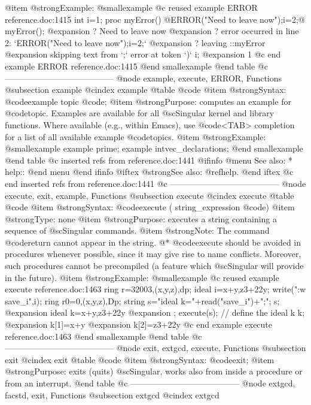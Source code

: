 @item @strong{Example:}
@smallexample
@c reused example ERROR reference.doc:1415 
int i=1;
proc myError() @{ERROR("Need to leave now");i=2;@}
myError();
@expansion{}    ? Need to leave now
@expansion{}    ? error occurred in line 2: `ERROR("Need to leave now");i=2;`
@expansion{}    ? leaving ::myError
@expansion{}    skipping text from `;` error at token `)`
i;
@expansion{} 1
@c end example ERROR reference.doc:1415
@end smallexample
@end table
@c ---------------------------------------
@node example, execute, ERROR, Functions
@subsection example
@cindex example
@table @code
@item @strong{Syntax:}
@code{example} topic @code{;}
@item @strong{Purpose:}
computes an example for @code{topic}. Examples are available for all
@sc{Singular} kernel and library functions. Where available (e.g.,
within Emacs), use @code{<TAB>} completion for a list of all available
example @code{topic}s.
@item @strong{Example:}
@smallexample
example prime;
example intvec_declarations;
@end smallexample
@end table
@c inserted refs from reference.doc:1441
@ifinfo
@menu
See also:
* help::
@end menu
@end ifinfo
@iftex
@strong{See also:}
@ref{help}.
@end iftex
@c end inserted refs from reference.doc:1441
@c ---------------------------------------
@node execute, exit, example, Functions
@subsection execute
@cindex execute
@table @code
@item @strong{Syntax:}
@code{execute (} string_expression @code{)}
@item @strong{Type:}
none
@item @strong{Purpose:}
executes a string containing a sequence of @sc{Singular} commands.
@item @strong{Note:}
The command @code{return} cannot appear in the string.
@* @code{execute} should be avoided in procedures
whenever possible, since it may give rise to name conflicts.  Moreover,
such procedures cannot be precompiled (a feature which @sc{Singular} will
provide in the future).
@item @strong{Example:}
@smallexample
@c reused example execute reference.doc:1463 
  ring r=32003,(x,y,z),dp;
  ideal i=x+y,z3+22y;
  write(":w save_i",i);
  ring r0=0,(x,y,z),Dp;
  string s="ideal k="+read("save_i")+";";
  s;
@expansion{} ideal k=x+y,z3+22y
@expansion{} ;
  execute(s); // define the ideal k
  k;
@expansion{} k[1]=x+y
@expansion{} k[2]=z3+22y
@c end example execute reference.doc:1463
@end smallexample
@end table
@c ---------------------------------------
@node exit, extgcd, execute, Functions
@subsection exit
@cindex exit
@table @code
@item @strong{Syntax:}
@code{exit;}
@item @strong{Purpose:}
exits (quits) @sc{Singular},
works also from inside a procedure or from an interrupt.
@end table
@c ---------------------------------------
@node extgcd, facstd, exit, Functions
@subsection extgcd
@cindex extgcd

